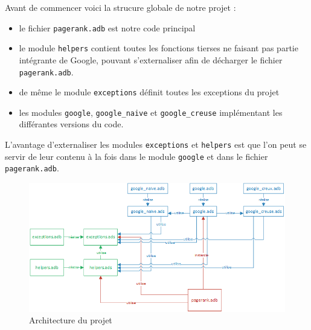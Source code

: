 Avant de commencer voici la strucure globale de notre projet :
\begin{itemize}
   \item le fichier \lstinline{pagerank.adb} est notre code principal
   \item le module \lstinline{helpers} contient toutes les fonctions tierses ne faisant pas partie intégrante de Google, pouvant s'externaliser afin de décharger le fichier \lstinline{pagerank.adb}.
   \item de même le module \lstinline{exceptions} définit toutes les exceptions du projet
   \item les modules \lstinline{google}, \lstinline{google_naive} et \lstinline{google_creuse} implémentant les différantes versions du code.
\end{itemize}

L'avantage d'externaliser les modules \lstinline{exceptions} et \lstinline{helpers} est que l'on peut se servir de leur contenu à la fois dans le module \lstinline{google} et dans le fichier \lstinline{pagerank.adb}.

\begin{figure}[ht!]
   \centering
   \includegraphics[scale=0.8]{partie-2/sous-partie-1/architecture.png}
   \caption{Architecture du projet \label{fig : architecture_projet}}
\end{figure}